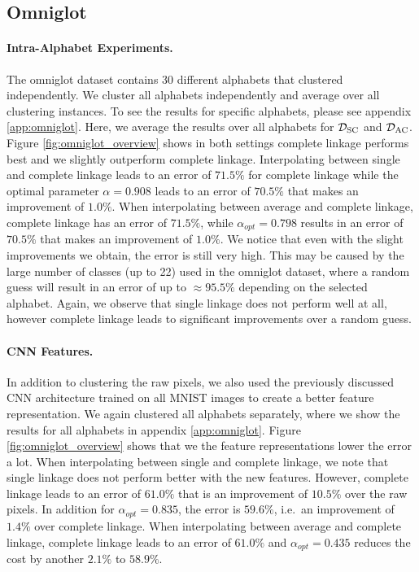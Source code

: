 \subsection{Omniglot}

\paragraph{Intra-Alphabet Experiments.} The omniglot dataset contains 30 different alphabets that clustered independently. We cluster all alphabets independently and average over all clustering instances. To see the results for specific alphabets, please see appendix \ref{app:omniglot}. Here, we average the results over all alphabets for $\mathcal{D}_\text{SC}$ and $\mathcal{D}_\text{AC}$. Figure \ref{fig:omniglot_overview} shows in both settings complete linkage performs best and we slightly outperform complete linkage. Interpolating between single and complete linkage leads to an error of $71.5\%$ for complete linkage while the optimal parameter $\alpha = 0.908$ leads to an error of $70.5\%$ that makes an improvement of $1.0\%$. When interpolating between average and complete linkage, complete linkage has an error of $71.5\%$, while $\alpha_{opt} = 0.798$ results in an error of $70.5\%$ that makes an improvement of $1.0\%$. We notice that even with the slight improvements we obtain, the error is still very high. This may be caused by the large number of classes (up to 22) used in the omniglot dataset, where a random  guess will result in an error of up to $\approx 95.5\%$ depending on the selected alphabet. Again, we observe that single linkage does not perform well at all, however complete linkage leads to significant improvements over a random guess.

\paragraph{CNN Features.} In addition to clustering the raw pixels, we also used the previously discussed CNN architecture trained on all MNIST images to create a better feature representation. We again clustered all alphabets separately, where we show the results for all alphabets in appendix \ref{app:omniglot}. Figure \ref{fig:omniglot_overview} shows that we the feature representations lower the error a lot. When interpolating between single and complete linkage, we note that single linkage does not perform better with the new features. However, complete linkage leads to an error of $61.0\%$ that is an improvement of $10.5\%$ over the raw pixels. In addition for $\alpha_{opt} = 0.835$, the error is $59.6\%$, i.e.\ an improvement of $1.4\%$ over complete linkage. When interpolating between average and complete linkage, complete linkage leads to an error of $61.0\%$ and $\alpha_{opt} = 0.435$ reduces the cost by another $2.1\%$ to $58.9\%$.


